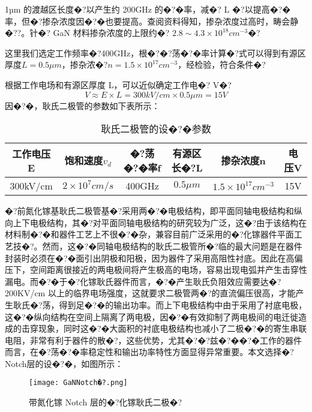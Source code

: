 \documentclass{zjureport}
\begin{document}
1µm 的渡越区长度�?以产生约 200GHz 的�?�率，减�? L �?以提高�?�率，但�?掺杂浓度因�?�也要提高。查阅资料得知，掺杂浓度过高时，畴会静�??。针�? GaN 材料掺杂浓度的上限约�? $2.8 \sim 4.3 × 10^{18}cm^{-3}$�?

这里我们选定工作频率�?400GHz，根�?�?荡�?�率计算�?式可以得到有源区厚度$L=0.5\mu m$，掺杂浓�?$n=1.5×10^{17}cm^{-3}$，经检验，符合条件�?

根据工作电场和有源区厚度 L，可以近似确定工作电�? V�?
\begin{equation}
	V\approx E×L=300kV/cm×0.5\mu m=15V
\end{equation}
因�?�，耿氏二极管的参数如下表所示：
\begin{table}
	\begin{center}
		\caption{耿氏二极管的设�?�参数}
		\begin{tabular}{|c|c|c|c|c|c|}%
			\hline
			\textbf{工作电压E} & \textbf{饱和速度$v_d$} & \textbf{�?荡�?�率f} & \textbf{有源区长�?L} & \textbf{掺杂浓度n} & \textbf{电压V}\\
			\hline
			300kV/cm & $ 2×10^7cm/s$ & 400GHz & $0.5\mu m$ & $1.5×10^{17}cm^{-3}$ & 15V\\
			\hline
		\end{tabular}
	\end{center}
\end{table}

�?前氮化镓基耿氏二极管基�?采用两�?�电极结构，即平面同轴电极结构和纵向上下电极结构，其�?对平面同轴电极结构的研究较为广泛，这�?由于该结构在材料制�?�和器件工艺上不很�?�杂，兼容目前广泛采用的�?化镓器件平面工艺技�?。然而，这�?�同轴电极结构的耿氏二极管所�?临的最大问题是在器件封装时必须在�?�面引出阴极和阳极，因为器件了采用高阻性衬底。因此在高偏压下，空间距离很接近的两电极间将产生极高的电场，容易出现电弧并产生击穿性漏电。而�?�于�?化镓耿氏器件而言，�?�产生耿氏负阻效应需要达�? 200KV/cm 以上的临界电场强度，这就要求二极管两�?的直流偏压很高，才能产生耿氏�?荡，得到足�?�的输出功率。而上下电极结构中由于采用了衬底电极，这�?�纵向结构在空间上隔离了两电极，因�?�有效抑制了两电极间的电迁徙造成的击穿现象，同时这�?�大面积的衬底电极结构也减小了二极�?�的寄生串联电阻，非常有利于器件的散�?，这些优势，尤其�?�?兹�?��?�工作的器件而言，在�?荡�?�率稳定性和输出功率特性方面显得异常重要。本文选择�?Notch层的设�?�，如图所示：
\begin{figure}[htbp]
	\centering
	\texttt{[image: GaNNotch�?.png]}
	\caption{带氮化镓 Notch 层的�?化镓耿氏二极�?}
\end{figure}
\end{document}
